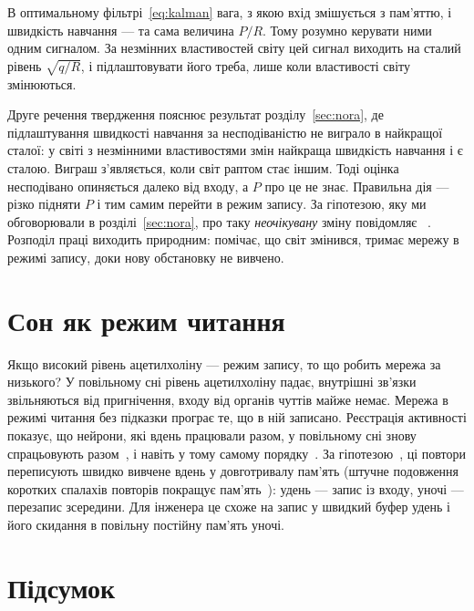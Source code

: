 \begin{keyblock}
\begin{proposition}
\label{prop:kalman}
В оптимальному фільтрі~\eqref{eq:kalman} вага, з якою вхід змішується з пам'яттю, і швидкість навчання --- та сама величина $P/R$. Тому розумно керувати ними одним сигналом. За незмінних властивостей світу цей сигнал виходить на сталий рівень $\sqrt{q/R}$, і підлаштовувати його треба, лише коли властивості світу змінюються.
\end{proposition}
\end{keyblock}

Друге речення твердження пояснює результат розділу~\ref{sec:nora}, де підлаштування швидкості навчання за несподіваністю не виграло в найкращої сталої: у світі з незмінними властивостями змін найкраща швидкість навчання і є сталою. Виграш з'являється, коли світ раптом стає іншим. Тоді оцінка несподівано опиняється далеко від входу, а $P$ про це не знає. Правильна дія --- різко підняти $P$ і тим самим перейти в режим запису. За гіпотезою, яку ми обговорювали в розділі~\ref{sec:nora}, про таку \emph{неочікувану} зміну повідомляє ~\cite{YuDayan2005}. Розподіл праці виходить природним:  помічає, що світ змінився,  тримає мережу в режимі запису, доки нову обстановку не вивчено.

\section{Сон як режим читання}

Якщо високий рівень ацетилхоліну --- режим запису, то що робить мережа за низького? У повільному сні рівень ацетилхоліну падає, внутрішні зв'язки звільняються від пригнічення, входу від органів чуттів майже немає. Мережа в режимі читання без підказки програє те, що в ній записано. Реєстрація активності показує, що нейрони, які вдень працювали разом, у повільному сні знову спрацьовують разом~\cite{WilsonMcNaughton1994}, і навіть у тому самому порядку~\cite{Skaggs1996}. За гіпотезою~\cite{Hasselmo1999}, ці повтори переписують швидко вивчене вдень у довготривалу пам'ять (штучне подовження коротких спалахів повторів покращує пам'ять~\cite{FernandezRuiz2019}): удень --- запис із входу, уночі --- перезапис зсередини. Для інженера це схоже на запис у швидкий буфер удень і його скидання в повільну постійну пам'ять уночі.

\section{Підсумок}

